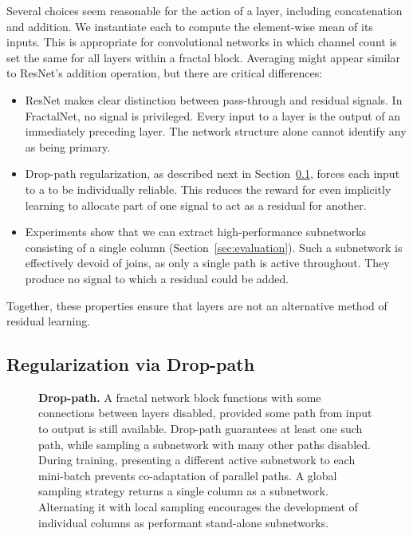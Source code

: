 \documentclass{article}
\newcommand{\fracnet}{FractalNet}
\newcommand{\resnet}{ResNet}
\newcommand{\Resnet}{ResNet}
\newcommand{\Droppath}{Drop-path}
\begin{document}
Several choices seem reasonable for the action of a  layer,
including concatenation and addition.  We instantiate each 
to compute the element-wise mean of its inputs.  This is appropriate for
convolutional networks in which channel count is set the same for all
 layers within a fractal block.  Averaging might appear similar
to {\resnet}'s addition operation, but there are critical differences:
\begin{itemize}
   \item{
      {\Resnet} makes clear distinction between pass-through and residual
      signals.  In {\fracnet}, no signal is privileged.  Every input to a
       layer is the output of an immediately preceding
       layer.  The network structure alone cannot identify any
      as being primary.
   }
   \item{
      {\Droppath} regularization, as described next in
      Section~\ref{sec:droppath}, forces each input to a  to
      be individually reliable.  This reduces the reward for even implicitly
      learning to allocate part of one signal to act as a residual for
      another.
   }
   \item{
      Experiments show that we can extract high-performance subnetworks
      consisting of a single column (Section~\ref{sec:evaluation}).  Such a
      subnetwork is effectively devoid of joins, as only a single path is
      active throughout.  They produce no signal to which a residual could be
      added.
   }
\end{itemize}
Together, these properties ensure that  layers are not an
alternative method of residual learning.

\subsection{Regularization via {\Droppath}}
\label{sec:droppath}

\begin{figure}[t]
   \begin{center}
      
   \end{center}
   \vspace{-0.02\linewidth}
   \caption{
      \textbf{{\Droppath}.}
         A fractal network block functions with some connections between layers
         disabled, provided some path from input to output is still available.
         {\Droppath} guarantees at least one such path, while sampling a
         subnetwork with many other paths disabled.  During training,
         presenting a different active subnetwork to each mini-batch prevents
         co-adaptation of parallel paths.  A global sampling strategy
         returns a single column as a subnetwork.  Alternating it with local
         sampling encourages the development of individual columns as
         performant stand-alone subnetworks.
   }
   \label{fig:droppath}
\end{figure}
\end{document}
